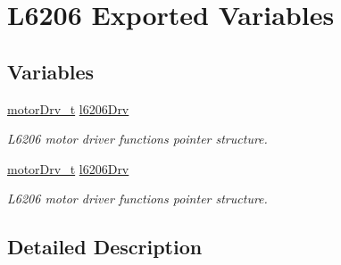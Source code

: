 \hypertarget{group___l6206___exported___variables}{}\section{L6206 Exported Variables}
\label{group___l6206___exported___variables}
\subsection*{Variables}
\begin{DoxyCompactItemize}
\item 
\mbox{\label{group___l6206___exported___variables_ga07450cad53f968fe361b2de16d54f53c}} 
\mbox{\hyperlink{structmotor_drv__t}{motor\+Drv\+\_\+t}} \mbox{\hyperlink{group___l6206___exported___variables_ga07450cad53f968fe361b2de16d54f53c}{l6206\+Drv}}
\begin{DoxyCompactList}\small\item\em L6206 motor driver functions pointer structure. \end{DoxyCompactList}\item 
\mbox{\label{group___l6206___exported___variables_ga07450cad53f968fe361b2de16d54f53c}} 
\mbox{\hyperlink{structmotor_drv__t}{motor\+Drv\+\_\+t}} \mbox{\hyperlink{group___l6206___exported___variables_ga07450cad53f968fe361b2de16d54f53c}{l6206\+Drv}}
\begin{DoxyCompactList}\small\item\em L6206 motor driver functions pointer structure. \end{DoxyCompactList}\end{DoxyCompactItemize}


\subsection{Detailed Description}
